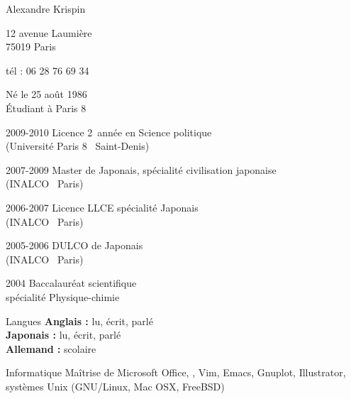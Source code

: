 \documentclass[10pt,a4paper]{scrartcl}
\begin{document}
\pagestyle{empty}
\begin{cv}{}
  \begin{cvlist}{}\label{PersDat}
\item Alexandre Krispin
\item 12 avenue Laumi\`ere \\
    75019 Paris
  \item \no t\'el : 06 28 76 69 34
  \item N\'e le 25 ao\^ut 1986 \\
    \'Etudiant \`a Paris 8
  \end{cvlist}

  \begin{cvlist}{}\label{formation}

  \item[2009-2010] Licence 2\ieme~ann\'ee en Science politique\\
    (Université Paris 8 \textemdash~Saint-Denis)

  \item[2007-2009] Master de Japonais, sp\'ecialit\'e civilisation japonaise\\
    (INALCO \textemdash~Paris)

  \item[2006-2007] Licence LLCE sp\'ecialit\'e Japonais\\
    (INALCO \textemdash~Paris)

  \item[2005-2006] DULCO de Japonais\\
    (INALCO \textemdash~Paris)

  \item[2004] Baccalaur\'eat scientifique\\
    sp\'ecialit\'e Physique-chimie

  \item[Langues] \textbf{Anglais :} lu, \'ecrit, parl\'e\\
    \textbf{Japonais :} lu, \'ecrit, parl\'e\\
    \textbf{Allemand :} scolaire\\

  \item[Informatique] Ma\^itrise de Microsoft Office, \LaTeXe, Vim, Emacs, Gnuplot,
    Illustrator, syst\`emes Unix (GNU/Linux, Mac OSX, FreeBSD)


\end{cvlist}
\end{cv}
\end{document}

